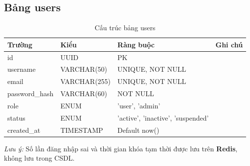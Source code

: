 \documentclass[12pt,a4paper]{article}
\begin{document}
\subsection{Bảng users}
\begin{longtable}{|l|l|l|p{5cm}|}
    \caption{Cấu trúc bảng users}                                                          \\
    \hline
    \rowcolor{headerblue}
    \textbf{Trường} & \textbf{Kiểu} & \textbf{Ràng buộc}                & \textbf{Ghi chú} \\
    \hline
    id              & UUID          & PK                                &                  \\
    \hline
    username        & VARCHAR(50)   & UNIQUE, NOT NULL                  &                  \\
    \hline
    email           & VARCHAR(255)  & UNIQUE, NOT NULL                  &                  \\
    \hline
    password\_hash  & VARCHAR(60)   & NOT NULL                          &                  \\
    \hline
    role            & ENUM          & 'user', 'admin'                   &                  \\
    \hline
    status          & ENUM          & 'active', 'inactive', 'suspended' &                  \\
    \hline
    created\_at     & TIMESTAMP     & Default now()                     &                  \\
    \hline
\end{longtable}

\textit{Lưu ý:} Số lần đăng nhập sai và thời gian khóa tạm thời được lưu trên \textbf{Redis}, không lưu trong CSDL.
\end{document}
